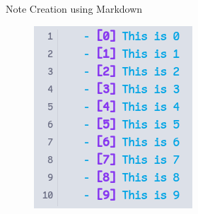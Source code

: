 \documentclass[10pt, xcolor=dvipsnames]{beamer}
\begin{document}
\begin{frame}{Note Creation using Markdown}
\begin{figure}
			\begin{minipage}{.32\textwidth}
				\centering
				\includegraphics[width=.95\linewidth]{../latex-image/markdown-code2}
			\end{minipage}%
			\begin{minipage}{.32\textwidth}
				\centering

\end{minipage}
\end{figure}
\end{frame}
\end{document}

